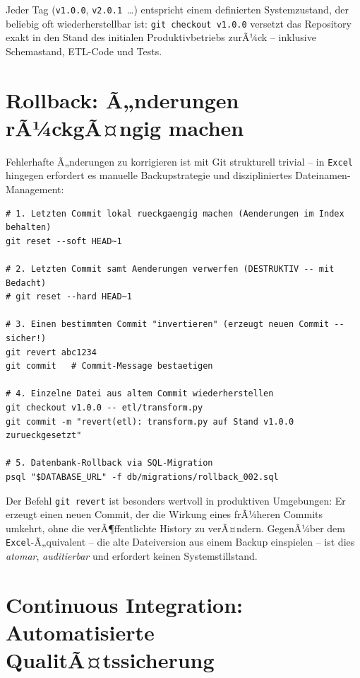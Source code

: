 ﻿\documentclass[12pt,a4paper]{report}
\theoremstyle{definition}
\theoremstyle{remark}
\newcommand{\excel}{\texttt{Excel}}
\newcommand{\code}[1]{\texttt{#1}}
\begin{document}
Jeder Tag (\code{v1.0.0}, \code{v2.0.1}~\ldots) entspricht einem
definierten Systemzustand, der beliebig oft wiederherstellbar ist:
\code{git checkout v1.0.0} versetzt das Repository exakt in den
Stand des initialen Produktivbetriebs zurÃ¼ck -- inklusive Schemastand,
ETL-Code und Tests.

\section{Rollback: Ã„nderungen rÃ¼ckgÃ¤ngig machen}

Fehlerhafte Ã„nderungen zu korrigieren ist mit Git strukturell trivial --
in \excel{} hingegen erfordert es manuelle Backupstrategie und
diszipliniertes Dateinamen-Management:

\begin{lstlisting}[style=bash, caption={Rollback-Szenarien mit Git}]
# 1. Letzten Commit lokal rueckgaengig machen (Aenderungen im Index behalten)
git reset --soft HEAD~1

# 2. Letzten Commit samt Aenderungen verwerfen (DESTRUKTIV -- mit Bedacht)
# git reset --hard HEAD~1

# 3. Einen bestimmten Commit "invertieren" (erzeugt neuen Commit -- sicher!)
git revert abc1234
git commit   # Commit-Message bestaetigen

# 4. Einzelne Datei aus altem Commit wiederherstellen
git checkout v1.0.0 -- etl/transform.py
git commit -m "revert(etl): transform.py auf Stand v1.0.0 zurueckgesetzt"

# 5. Datenbank-Rollback via SQL-Migration
psql "$DATABASE_URL" -f db/migrations/rollback_002.sql
\end{lstlisting}

Der Befehl \code{git revert} ist besonders wertvoll in produktiven Umgebungen:
Er erzeugt einen neuen Commit, der die Wirkung eines frÃ¼heren Commits
umkehrt, ohne die verÃ¶ffentlichte History zu verÃ¤ndern.
GegenÃ¼ber dem \excel-Ã„quivalent -- die alte Dateiversion aus einem
Backup einspielen -- ist dies \emph{atomar}, \emph{auditierbar} und
erfordert keinen Systemstillstand.

\section{Continuous Integration: Automatisierte QualitÃ¤tssicherung}
\end{document}
